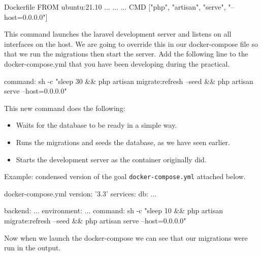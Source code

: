 \documentclass{csse4400}
\begin{document}
\begin{code}[language=docker]{Dockerfile}
  FROM ubuntu:21.10
  ... 
  ... 
  ...
  CMD ["php", "artisan", "serve", "--host=0.0.0.0"]
\end{code}


This command launches the laravel development server and listens on all interfaces on the host.
We are going to override this in our docker-compose file so that we run the migrations then start the server.
Add the following line to the docker-compose.yml that you have been developing during the practical.

\begin{code}[language=docker-compose]{}
  command: sh -c "sleep 30 && php artisan migrate:refresh --seed && php artisan serve --host=0.0.0.0"
\end{code}

This new command does the following:

\begin{itemize}
  \item Waits for the database to be ready in a simple way.
  \item Runs the migrations and seeds the database, as we have seen earlier.
  \item Starts the development server as the container originally did.
\end{itemize}

Example: condensed version of the goal \texttt{docker-compose.yml} attached below.

\begin{code}[language=docker-compose]{docker-compose.yml}
  version: '3.3'
  services:
    db:
      ...
  
    backend:
      ...
      environment:
        ...
      command: sh -c "sleep 10 && php artisan migrate:refresh --seed && php artisan serve --host=0.0.0.0"
\end{code}

Now when we launch the docker-compose we can see that our migrations were run in the output.

\end{document}
